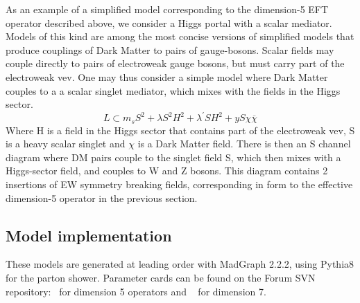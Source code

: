 
As an example of a simplified model corresponding to the dimension-5 EFT operator 
described above, we consider a Higgs portal with a scalar mediator. Models of this kind
are among the most concise versions of simplified models that produce 
couplings of Dark Matter to pairs of gauge-bosons.  Scalar fields may couple directly to pairs of electroweak gauge bosons, 
but must carry part of the electroweak vev.  One may thus consider a simple model where Dark Matter couples to a a scalar 
singlet mediator, which mixes with the fields in the Higgs sector.
\begin{equation}
L\subset m_s S^2 + \lambda S^2H^2 +\lambda^{'} S H^2 + y S \chi \overline{\chi}
\end{equation}
Where H is a field in the Higgs sector that contains part of the electroweak vev, 
S is a heavy scalar singlet and $\chi$ is a Dark Matter field. 
There is then an S channel diagram where DM pairs couple to the singlet field S, 
which then mixes with a Higgs-sector field, and couples to W and Z bosons. 
This diagram contains 2 insertions of EW symmetry breaking fields, 
corresponding in form to the effective dimension-5 operator in the previous section.   

\subsection{Model implementation}

These models are generated at leading
order with MadGraph 2.2.2, using Pythia8 for the parton shower.
Parameter cards can be found on the Forum SVN repository:~\cite{ForumSVN_EWEFTD7} for dimension 5 operators
and ~\cite{ForumSVN_EWEFTD7} for dimension 7.
